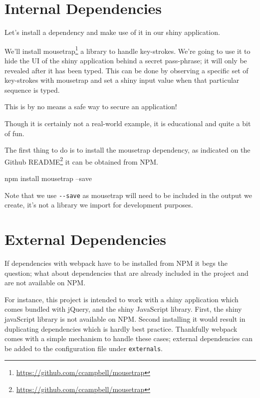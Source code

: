 \documentclass[10pt,]{krantz}
\makeatletter
\newenvironment{Shaded}{\begin{snugshade}}{\end{snugshade}}
\newcommand{\ExtensionTok}[1]{#1}
\newcommand{\NormalTok}[1]{#1}
\renewcommand{\href}[2]{#2\footnote{\url{#1}}}
\newenvironment{kframe}{%
\medskip{}
\setlength{\fboxsep}{.8em}
 \def\at@end@of@kframe{}%
 \ifinner\ifhmode%
  \def\at@end@of@kframe{\end{minipage}}%
  \begin{minipage}{\columnwidth}%
 \fi\fi%
 \def\FrameCommand##1{\hskip\@totalleftmargin \hskip-\fboxsep
 \colorbox{shadecolor}{##1}\hskip-\fboxsep
     \hskip-\linewidth \hskip-\@totalleftmargin \hskip\columnwidth}%
 \MakeFramed {\advance\hsize-\width
   \@totalleftmargin\z@ \linewidth\hsize
   \@setminipage}}%
 {\par\unskip\endMakeFramed%
 \at@end@of@kframe}
\renewenvironment{Shaded}{\begin{kframe}}{\end{kframe}}
\newenvironment{rmdblock}[1]
  {
  \begin{itemize}
  \renewcommand{\labelitemi}{
    \raisebox{-.7\height}[0pt][0pt]{
      {\setkeys{Gin}{width=3em,keepaspectratio}\texttt{[image: images/\#1]}}
    }
  }
  \setlength{\fboxsep}{1em}
  \begin{kframe}
  \item
  }
  {
  \end{kframe}
  \end{itemize}
  }
\newenvironment{rmdnote}
  {\begin{rmdblock}{note}}
  {\end{rmdblock}}
\makeatother
\begin{document}
\hypertarget{webpack-intro-internal-dependencies}{%
\section{Internal Dependencies}\label{webpack-intro-internal-dependencies}}

Let's install a dependency and make use of it in our shiny application.

We'll install \href{https://github.com/ccampbell/mousetrap}{mousetrap} a library to handle key-strokes. We're going to use it to hide the UI of the shiny application behind a secret pass-phrase; it will only be revealed after it has been typed. This can be done by observing a specific set of key-strokes with mousetrap and set a shiny input value when that particular sequence is typed.

\begin{rmdnote}
This is by no means a safe way to secure an application!
\end{rmdnote}

Though it is certainly not a real-world example, it is educational and quite a bit of fun.

The first thing to do is to install the mousetrap dependency, as indicated on the \href{https://github.com/ccampbell/mousetrap}{Github README} it can be obtained from NPM.

\begin{Shaded}
\begin{Highlighting}[]
\ExtensionTok{npm}\NormalTok{ install mousetrap --save}
\end{Highlighting}
\end{Shaded}

Note that we use \texttt{-\/-save} as mousetrap will need to be included in the output we create, it's not a library we import for development purposes.

\hypertarget{webpack-intro-external-dependencies}{%
\section{External Dependencies}\label{webpack-intro-external-dependencies}}

If dependencies with webpack have to be installed from NPM it begs the question; what about dependencies that are already included in the project and are not available on NPM.

For instance, this project is intended to work with a shiny application which comes bundled with jQuery, and the shiny JavaScript library. First, the shiny javaScript library is not available on NPM. Second installing it would result in duplicating dependencies which is hardly best practice. Thankfully webpack comes with a simple mechanism to handle these cases; external dependencies can be added to the configuration file under \texttt{externals}.
\end{document}

